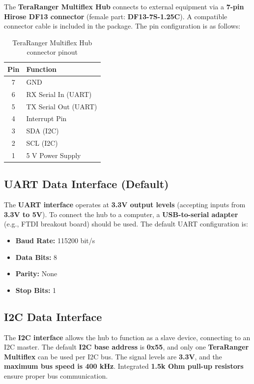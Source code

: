 The \textbf{TeraRanger Multiflex Hub} connects to external equipment via a \textbf{7-pin Hirose DF13 connector} (female part: \textbf{DF13-7S-1.25C}). A compatible connector cable is included in the package. The pin configuration is as follows:

\begin{table}[H]
	\centering
	\begin{tabular}{|c|l|}
		\hline
		\textbf{Pin} & \textbf{Function} \\
		\hline
		7   & GND \\
		6   & RX Serial In (UART) \\
		5   & TX Serial Out (UART) \\
		4   & Interrupt Pin \\
		3   & SDA (I2C) \\
		2   & SCL (I2C) \\
		1   & 5 V Power Supply \\
		\hline
	\end{tabular}
	\caption{TeraRanger Multiflex Hub connector pinout}
	\label{tab:multiflex_pinout}
\end{table}

\subsection{UART Data Interface (Default)}
The \textbf{UART interface} operates at \textbf{3.3V output levels} (accepting inputs from \textbf{3.3V to 5V}). To connect the hub to a computer, a \textbf{USB-to-serial adapter} (e.g., FTDI breakout board) should be used. The default UART configuration is:

\begin{itemize}
	\item \textbf{Baud Rate:} 115200 bit/s
	\item \textbf{Data Bits:} 8
	\item \textbf{Parity:} None
	\item \textbf{Stop Bits:} 1
\end{itemize}

\subsection{I2C Data Interface}
The \textbf{I2C interface} allows the hub to function as a slave device, connecting to an I2C master. The default \textbf{I2C base address} is \textbf{0x55}, and only one \textbf{TeraRanger Multiflex} can be used per I2C bus. The signal levels are \textbf{3.3V}, and the \textbf{maximum bus speed is 400 kHz}. Integrated \textbf{1.5k Ohm pull-up resistors} ensure proper bus communication.

